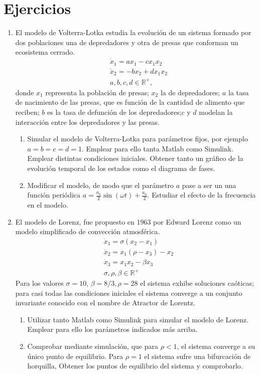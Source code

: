 \section*{Ejercicios}
\begin{enumerate}
\item El modelo de Volterra-Lotka estudia la evolución de un sistema formado por dos poblaciones una de depredadores y otra de presas que conforman un ecosistema cerrado.
\begin{align*}
&\dot x_1 = ax_1-cx_1x_2\\
&\dot x_2 =-bx_2 + dx_1x_2\\
&a,b,c,d \in \mathbb{R}^+,
\end{align*}
donde $x_1$ representa la población de presas; $x_2$ la de depredadores; $a$ la tasa de nacimiento de las presas, que es función de la cantidad de alimento que reciben; $b$ es la tasa de defunción de los depredadores;$c$ y $d$ modelan la interacción entre los depredadores y las presas.

\begin{enumerate}
\item Simular el modelo de Volterra-Lotka para parámetros fijos, por ejemplo $a=b=c=d=1$. Emplear para ello tanta Matlab como Simulink. Emplear distintas condiciones iniciales. Obtener tanto un gráfico de la evolución temporal de los estados como el diagrama de fases.
\item Modificar el modelo, de modo que el parámetro $a$ pase a ser un una función periódica $a = \frac{a_0}{2}\sin(\omega t)+\frac{a_0}{2}$. Estudiar el efecto de la frecuencia en el modelo.
\end{enumerate}
\item El modelo de Lorenz, fue propuesto en 1963 por Edward Lorenz  como un modelo simplificado de convección atmosférica.
\begin{align*}
&\dot x_1 = \sigma (x_2 -x_1)\\
&\dot x_2 = x_1 (\rho -x_3) - x_2\\
&\dot x_3 = x_1x_2 -\beta x_3\\
& \sigma, \rho, \beta \in \mathbb{R}^+
\end{align*}
Para los valores $\sigma  = 10$, $\beta = 8/3, \rho = 28$ el sistema exhibe soluciones caóticas; para casi todas las condiciones iniciales el sistema converge a un conjunto invariante conocido con el nombre de Atractor de Lorentz.
\begin{enumerate}
\item Utilizar tanto Matlab como  Simulink para simular el modelo de Lorenz. Emplear para ello los parámetros indicados más arriba.
\item Comprobar mediante simulación,  que para $\rho < 1$, el sistema converge a su único  punto de equilibrio. Para $\rho = 1$ el sistema sufre una bifurcación de horquilla, Obtener los puntos de equilibrio del sistema y comprobarlo.
 \end{enumerate}
 

\end{enumerate}
